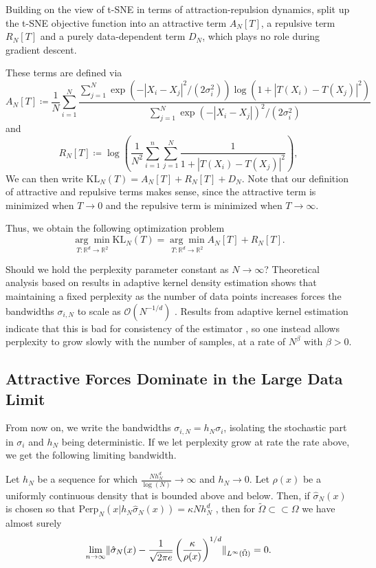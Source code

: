 Building on the view of t-SNE in terms of attraction-repulsion dynamics, \cite{murray2024largedatalimitsscaling} split up the t-SNE objective function into an attractive term $A_N[T]$, a repulsive term $R_N[T]$ and a purely data-dependent term $D_N$, which plays no role during gradient descent. 

These terms are defined via  
\begin{equation}
    A_N[T] \coloneq \frac{1}{N} \sum_{i=1}^N \frac{\sum_{j=1}^N \exp(-|X_i - X_j|^2/(2\sigma_i^2)) \log(1+ |T(X_i) - T(X_j)|^2)}{\sum_{j=1}^N \exp(-|X_i - X_j|)^2 / (2\sigma_i^2)}
\end{equation}
and 
\begin{equation}
    R_N[T] \coloneq \log \left( \frac{1}{N^2} \sum_{i=1}^n \sum_{j=1}^N \frac{1}{1+ |T(X_i) - T(X_j)|^2} \right), 
\end{equation}
We can then write $\text{KL}_N (T) = A_N[T] + R_N[T] + D_N$. Note that our definition of attractive and repulsive terms makes sense, since the attractive term is minimized when $T\to 0$ and the repulsive term is minimized when $T \to \infty$.

Thus, we obtain the following optimization problem
\begin{equation}
    \underset{T: \mathbb{R}^d \to \mathbb{R}^2}{\arg \min} \text{KL}_N (T) = \underset{T: \mathbb{R}^d \to \mathbb{R}^2}{\arg \min} A_N[T] + R_N[T].
\end{equation}

Should we hold the perplexity parameter constant as $N \to \infty$?
Theoretical analysis based on results in adaptive kernel density estimation shows that maintaining a fixed perplexity as the number of data points increases forces the bandwidths $\sigma_{i,N}$ to scale as $\mathcal{O}(N^{-1/d})$ \cite{murray2024largedatalimitsscaling}.
Results from adaptive kernel estimation indicate that this is bad for consistency of the estimator , so one instead allows perplexity to grow slowly with the number of samples, at a rate of $N^\beta$ with $\beta > 0$. 

\subsection*{Attractive Forces Dominate in the Large Data Limit}  
From now on, we write the bandwidths $\sigma_{i,N} = h_N \sigma_i$, isolating the stochastic part in $\sigma_i$ and $h_N$ being deterministic. 
If we let perplexity grow at rate the rate above, we get the following limiting bandwidth. 
\begin{thm}
    Let $h_N$ be a sequence for which $\frac{N h_N^d}{\log(N)} \to \infty$ and $h_N \to 0$. Let $\rho(x)$ be a uniformly continuous density that is bounded above and below. Then, if $\hat{\sigma}_N(x)$ is chosen so that $\text{Perp}_N(x|h_N \hat{\sigma}_N(x)) = \kappa N h_N^d$ , then for $\tilde{\Omega} \subset \subset \Omega$ we have almost surely
    \[\lim_{n \to \infty} \lVert\hat{\sigma}_N(x) - \frac{1}{\sqrt{2 \pi e}} \left(\frac{\kappa}{\rho(x)}\right)^{1/d}\rVert_{L^\infty(\tilde{\Omega})} = 0. 
    \]
\end{thm}

